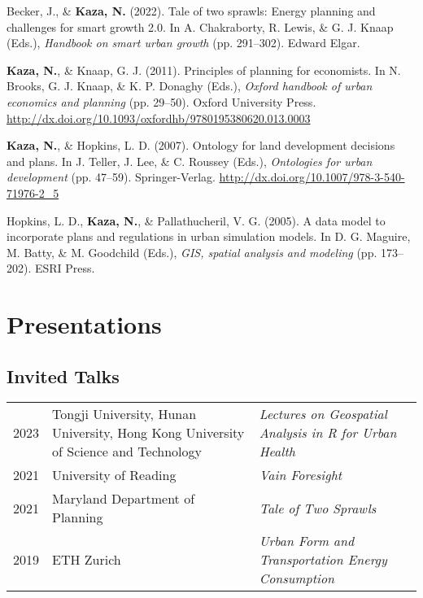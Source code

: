 \documentclass[11pt,a4paper,]{awesome-cv}
\newlength{\cslhangindent}
\newenvironment{CSLReferences}[2] %
 {\begin{list}{}{%
  \setlength{\itemindent}{0pt}
  \setlength{\leftmargin}{0pt}
  \setlength{\parsep}{0pt}
  \ifodd #1
   \setlength{\leftmargin}{\cslhangindent}
   \setlength{\itemindent}{-1\cslhangindent}
  \fi
  \setlength{\itemsep}{#2\baselineskip}}}
 {\end{list}}
\begin{document}
\label{refs-0aaabffd17298ffb35a7cdf35de3a454}
\begin{CSLReferences}{1}{0}
Becker, J., \& \textbf{Kaza, N.} (2022). Tale of two sprawls: Energy
planning and challenges for smart growth 2.0. In A. Chakraborty, R.
Lewis, \& G. J. Knaap (Eds.), \emph{Handbook on smart urban growth} (pp.
291--302). Edward Elgar.

\textbf{Kaza, N.}, \& Knaap, G. J. (2011). Principles of planning for
economists. In N. Brooks, G. J. Knaap, \& K. P. Donaghy (Eds.),
\emph{Oxford handbook of urban economics and planning} (pp. 29--50).
Oxford University Press.
\url{http://dx.doi.org/10.1093/oxfordhb/9780195380620.013.0003}

\textbf{Kaza, N.}, \& Hopkins, L. D. (2007). Ontology for land
development decisions and plans. In J. Teller, J. Lee, \& C. Roussey
(Eds.), \emph{Ontologies for urban development} (pp. 47--59).
Springer-Verlag. \url{http://dx.doi.org/10.1007/978-3-540-71976-2_5}

Hopkins, L. D., \textbf{Kaza, N.}, \& Pallathucheril, V. G. (2005). A
data model to incorporate plans and regulations in urban simulation
models. In D. G. Maguire, M. Batty, \& M. Goodchild (Eds.), \emph{GIS,
spatial analysis and modeling} (pp. 173--202). ESRI Press.

\end{CSLReferences}

\section{Presentations}\label{presentations}

\subsection{Invited Talks}\label{invited-talks}

\begin{tabular}{lp{6cm}l}
  2023 & Tongji University, Hunan University, Hong Kong University of Science and Technology & \emph{Lectures on Geospatial Analysis in R for Urban Health} \\ 
  2021 & University of Reading & \emph{Vain Foresight} \\ 
  2021 & Maryland Department of Planning & \emph{Tale of Two Sprawls} \\ 
  2019 & ETH Zurich & \emph{Urban Form and Transportation Energy Consumption} \\ 
  \end{tabular}
\end{document}
